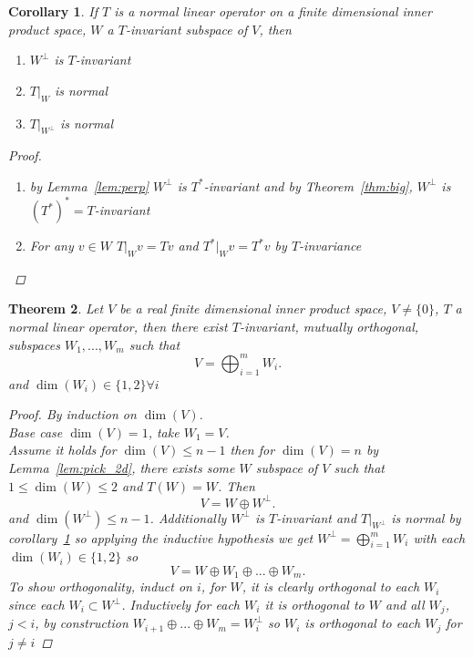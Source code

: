 \documentclass{article}
\newtheorem{theorem}{Theorem}[section] %
\newtheorem{corollary}[theorem]{Corollary} %
\begin{document}
    \begin{corollary}\label{cor:wperp}
        If $T$ is a normal linear operator on a finite dimensional inner product space, $W$ a $T$-invariant subspace of $V$, then 
        \begin{enumerate}[label = (\alph*)]
            \item 
                $W^{\perp}$ is $T$-invariant
            \item 
                $T|_W$ is normal
            \item 
                $T|_{W^{\perp}}$ is normal
        \end{enumerate}
        \begin{proof}
            ~\\
            \begin{enumerate}[label = (\alph*)]
                \item by Lemma~\ref{lem:perp} $W^{\perp}$ is $T^{*}$-invariant and by
                    Theorem~\ref{thm:big}, $W^{\perp}$ is $(T^{*})^{*}=T$-invariant 
                \item  For any $v \in W$ $T|_Wv = Tv$ and $T^{*}|_Wv = T^{*}v$ by $T$-invariance
            \end{enumerate}
        \end{proof}
    \end{corollary}
    \begin{theorem}
        Let $V$ be a real finite dimensional inner product space, $V \ne \{0\}$, $T$ a
        normal linear operator, then there exist $T$-invariant, mutually orthogonal, subspaces $W_1,...,W_m$ such that
        \[
            V = \bigoplus_{i=1}^{m} W_i
        .\]
        and $\dim(W_i) \in \{1,2\} \forall i$
        \begin{proof}
            By induction on $\dim(V)$. \\Base case  $\dim(V) =1$, take $W_1 = V$.\\
            Assume it holds for $\dim(V) \le n-1$ then for  $\dim(V) = n$ by Lemma~\ref{lem:pick_2d},
            there exists some $W$ subspace of $V$ such that $1 \le \dim(W) \le 2$ and $T(W) = W$. Then
             \[
            V = W \oplus W^{\perp}
            .\] 
            and $\dim(W^{\perp}) \le n-1 $. Additionally $W^{\perp}$ is $T$-invariant and $T|_{W^{\perp}}$ is normal by corollary~\ref{cor:wperp}
            so applying the inductive hypothesis we get $W^{\perp} = \bigoplus_{i=1}^{m}W_i$ with each $\dim(W_i) \in \{1,2\}$
            so
            \[
            V = W \oplus W_1 \oplus ... \oplus W_m
            .\] 
            To show orthogonality, induct on $i$, for  $W$, it is clearly orthogonal to each $W_i$ since
            each $W_i \subset W^{\perp}$. Inductively for each $W_i$ it is orthogonal to $W$ and all $W_j$, $j < i$, by construction
            $W_{i+1} \oplus  ... \oplus W_m = W_{i}^{\perp}$ so $W_i$ is orthogonal to each $W_j$ for $j \ne i$
        \end{proof}
    \end{theorem}

    
\end{document}
